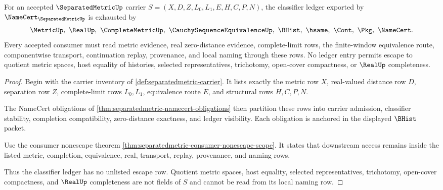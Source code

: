 \begin{theorem}\label{thm:separatedmetric-classifier-ledger-scope}
For an accepted $\SeparatedMetricUp$ carrier $S=(X,D,Z,L_0,L_1,E,H,C,P,N)$, the classifier ledger exported by $\NameCert_{\SeparatedMetricUp}$ is exhausted by
$$
\MetricUp,\ \RealUp,\ \CompleteMetricUp,\ \CauchySequenceEquivalenceUp,\ \BHist,\ \hsame,\ \Cont,\ \Pkg,\ \NameCert .
$$
Every accepted consumer must read metric evidence, real zero-distance evidence, complete-limit rows, the finite-window equivalence route, componentwise transport, continuation replay, provenance, and local naming through these rows. No ledger entry permits escape to quotient metric spaces, host equality of histories, selected representatives, trichotomy, open-cover compactness, or $\RealUp$ completeness.
\end{theorem}
\begin{proof}
Begin with the carrier inventory of \autoref{def:separatedmetric-carrier}. It lists exactly the metric row $X$, real-valued distance row $D$, separation row $Z$, complete-limit rows $L_0,L_1$, equivalence route $E$, and structural rows $H,C,P,N$.

The NameCert obligations of \autoref{thm:separatedmetric-namecert-obligations} then partition these rows into carrier admission, classifier stability, completion compatibility, zero-distance exactness, and ledger visibility. Each obligation is anchored in the displayed $\BHist$ packet.

Use the consumer nonescape theorem \autoref{thm:separatedmetric-consumer-nonescape-scope}. It states that downstream access remains inside the listed metric, completion, equivalence, real, transport, replay, provenance, and naming rows.

Thus the classifier ledger has no unlisted escape row. Quotient metric spaces, host equality, selected representatives, trichotomy, open-cover compactness, and $\RealUp$ completeness are not fields of $S$ and cannot be read from its local naming row.
\end{proof}


